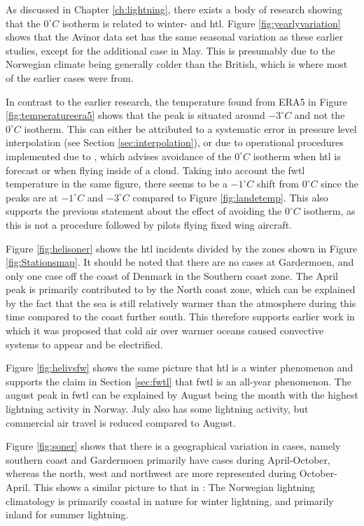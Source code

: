As discussed in Chapter \ref{ch:lightning}, there exists a body of research showing that the $0^{\circ}C$ isotherm is related to winter- and \acrlong{htl}. Figure \ref{fig:yearlyvariation} shows that the Avinor data set has the same seasonal variation as these earlier studies, except for the additional case in May. This is presumably due to the Norwegian climate being generally colder than the British, which is where most of the earlier cases were from. 

In contrast to the earlier research, the temperature found from ERA5 in Figure \ref{fig:temperatureera5} shows that the peak is situated around $-3^{\circ}C$ and not the $0^{\circ}C$ isotherm. This can either be attributed to a systematic error in pressure level interpolation (see Section \ref{sec:interpolation}), or due to operational procedures implemented due to \cite{lande1999}, which advises avoidance of the $0^{\circ}C$ isotherm when \acrshort{htl} is forecast or when flying inside of a cloud. Taking into account the \acrshort{fwtl} temperature in the same figure, there seems to be a $-1^{\circ}C$ shift from $0^{\circ}C$ since the peaks are at $-1^{\circ}C$ and $-3^{\circ}C$ compared to Figure \ref{fig:landetemp}. This also supports the previous statement about the effect of avoiding the $0^{\circ}C$ isotherm, as this is not a procedure followed by pilots flying fixed wing aircraft.

Figure \ref{fig:helisoner} shows the \acrshort{htl} incidents divided by the zones shown in Figure \ref{fig:Stationsmap}. It should be noted that there are no cases at Gardermoen, and only one case off the coast of Denmark in the Southern coast zone. The April peak is primarily contributed to by the North coast zone, which can be explained by the fact that the sea is still relatively warmer than the atmosphere during this time compared to the coast further south. This therefore supports earlier work in which it was proposed that cold air over warmer oceans caused convective systems to appear and be electrified. 

Figure \ref{fig:helivsfw} shows the same picture that \acrshort{htl} is a winter phenomenon and supports the claim in Section \ref{sec:fwtl} that \acrshort{fwtl} is an all-year phenomenon. The august peak in \acrshort{fwtl} can be explained by August being the month with the highest lightning activity in Norway. July also has some lightning activity, but commercial air travel is reduced compared to August. 

Figure \ref{fig:soner} shows that there is a geographical variation in cases, namely southern coast and Gardermoen primarily have cases during April-October, whereas the north, west and northwest are more represented during October-April. This shows a similar picture to that in \cite{koeltzow2018}: The Norwegian lightning climatology is primarily coastal in nature for winter lightning, and primarily inland for summer lightning. 

